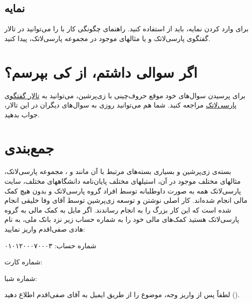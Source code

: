\subsection{نمایه}
برای وارد کردن نمایه، باید از 
استفاده کنید. 
راهنمای چگونگی کار با 
را می‌توانید در تالار گفتگوی پارسی‌لاتک و یا مثالهای موجود در مجموعه پارسی‌لاتک، پیدا کنید.

\section{اگر سوالی داشتم، از کی بپرسم؟}
برای پرسیدن سوال‌های خود موقع حروف‌چینی با زی‌پرشین،  می‌توانید به
 \href{http://forum.parsilatex.com}{تالار گفتگوی پارسی‌لاتک}%
مراجعه کنید. شما هم می‌توانید روزی به سوال‌های دیگران در این تالار، جواب بدهید.
    
\section{جمع‌بندی}
بسته‌ی زی‌پرشین و بسیاری بسته‌های مرتبط با آن مانند  و ، مجموعه پارسی‌لاتک، مثالهای مختلف موجود در آن، استیلهای مختلف پایان‌نامه دانشگاههای مختلف، سایت پارسی‌لاتک همه به صورت داوطلبانه توسط افراد گروه پارسی‌لاتک و بدون هیچ کمک مالی انجام شده‌اند. کار اصلی نوشتن و توسعه زی‌پرشین توسط آقای وفا خلیقی انجام شده است که این کار بزرگ را به انجام رساندند.
اگر مایل به کمک مالی به گروه پارسی‌لاتک هستید کمک‌های مالی خود را به  شماره حساب 
زیر نزد بانک ملی، به نام هادی صفی‌اقدم واریز نمایید:
\begin{center}
شماره حساب: ۰۱۰۱۲۰۰۰۷۰۰۰۳

شماره کارت: 

شماره شبا: 
\end{center}
لطفاً پس از واریز وجه، موضوع را از طریق ایمیل به آقای صفی‌اقدم اطلاع دهید ().